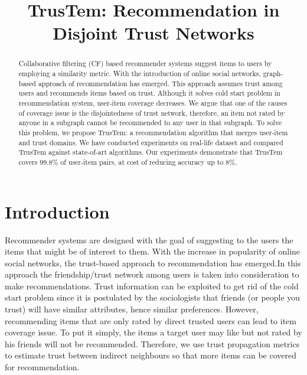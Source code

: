 \documentclass[11pt, conference, onecolumn]{IEEEtran}
\begin{document}
\nocite{*}
\title{TrusTem: Recommendation in Disjoint Trust Networks}

\author{
\and
{}
}

\maketitle

\begin{abstract}
Collaborative filtering (CF) based recommender systems suggest items to users by employing a similarity metric. With the introduction of online social networks, graph-based approach of recommendation has emerged. This approach assumes trust among users and recommends items based on trust. Although it solves cold start problem in recommendation system, user-item coverage decreases. We argue that one of the causes of coverage issue is the disjointedness of trust network, therefore, an item not rated by anyone in a subgraph cannot be recommended to any user in that subgraph. To solve this problem, we propose TrusTem: a recommendation algorithm that merges user-item and trust domains. We have conducted experiments on real-life dataset and compared TrusTem against state-of-art algorithms. Our experiments demonstrate that TrusTem covers $99.8\%$ of user-item pairs, at cost of reducing accuracy up to $8\%$.
\end{abstract}

\section{Introduction} \label{sec:intro}
Recommender systems are designed with the goal of suggesting to the users the items that might be of interest to them. With the increase in popularity of online social networks, the trust-based approach to recommendation has emerged.In this approach the friendship/trust network among users is taken into consideration to make recommendations. Trust information can be exploited to get rid of the cold start problem since it is postulated by the sociologists that friends (or people you trust) will have similar attributes, hence similar preferences. However, recommending items that are only rated by direct trusted users can lead to item coverage issue. To put it simply, the items a target user may like but not rated by his friends will not be recommended. Therefore, we use trust propagation metrics to estimate trust between indirect neighbours so that more items can be covered for recommendation. 
\end{document}
